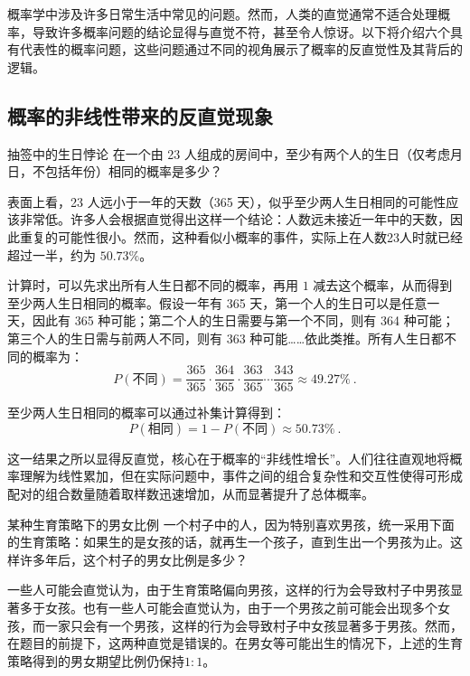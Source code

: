
概率学中涉及许多日常生活中常见的问题。然而，人类的直觉通常不适合处理概率，导致许多概率问题的结论显得与直觉不符，甚至令人惊讶。以下将介绍六个具有代表性的概率问题，这些问题通过不同的视角展示了概率的反直觉性及其背后的逻辑。

\subsection{概率的非线性带来的反直觉现象}

\begin{example}{抽签中的生日悖论}
在一个由 23 人组成的房间中，至少有两个人的生日（仅考虑月日，不包括年份）相同的概率是多少？
\end{example}

表面上看，23 人远小于一年的天数（365 天），似乎至少两人生日相同的可能性应该非常低。许多人会根据直觉得出这样一个结论：人数远未接近一年中的天数，因此重复的可能性很小。然而，这种看似小概率的事件，实际上在人数23人时就已经超过一半，约为 $50.73\%$。

计算时，可以先求出所有人生日都不同的概率，再用 $1$ 减去这个概率，从而得到至少两人生日相同的概率。假设一年有 365 天，第一个人的生日可以是任意一天，因此有 365 种可能；第二个人的生日需要与第一个不同，则有 364 种可能；第三个人的生日需与前两人不同，则有 363 种可能……依此类推。所有人生日都不同的概率为：
\begin{equation}
P(\text{不同}) = \frac{365}{365} \cdot \frac{364}{365} \cdot \frac{363}{365} \cdots \frac{343}{365}\approx49.27\%~.
\end{equation}

至少两人生日相同的概率可以通过补集计算得到：
\begin{equation}
P(\text{相同})= 1 - P(\text{不同})\approx50.73\%~.
\end{equation}

这一结果之所以显得反直觉，核心在于概率的“非线性增长”。人们往往直观地将概率理解为线性累加，但在实际问题中，事件之间的组合复杂性和交互性使得可形成配对的组合数量随着取样数迅速增加，从而显著提升了总体概率。

\begin{example}{某种生育策略下的男女比例}
一个村子中的人，因为特别喜欢男孩，统一采用下面的生育策略：如果生的是女孩的话，就再生一个孩子，直到生出一个男孩为止。这样许多年后，这个村子的男女比例是多少？
\end{example}

一些人可能会直觉认为，由于生育策略偏向男孩，这样的行为会导致村子中男孩显著多于女孩。也有一些人可能会直觉认为，由于一个男孩之前可能会出现多个女孩，而一家只会有一个男孩，这样的行为会导致村子中女孩显著多于男孩。然而，在题目的前提下，这两种直觉是错误的。在男女等可能出生的情况下，上述的生育策略得到的男女期望比例仍保持$1:1$。

